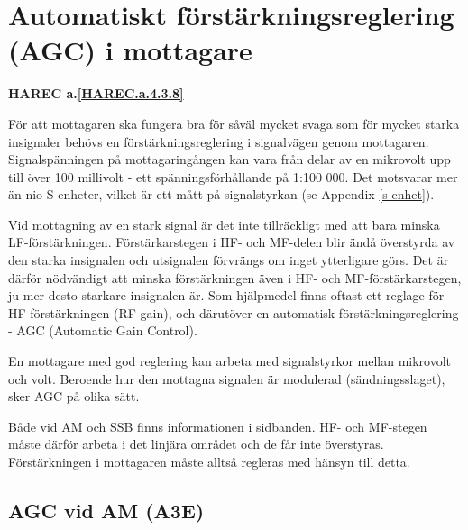 \section{Automatiskt förstärkningsreglering (AGC) i mottagare}
\textbf{HAREC a.\ref{HAREC.a.4.3.8}\label{myHAREC.a.4.3.8}}

För att mottagaren ska fungera bra för såväl mycket svaga som för
mycket starka insignaler behövs en förstärkningsreglering i
signalvägen genom mottagaren. Signalspänningen på mottagaringången kan
vara från delar av en mikrovolt upp till över 100 millivolt - ett
spänningsförhållande på 1:100 000. Det motsvarar mer än nio S-enheter,
vilket är ett mått på signalstyrkan (se Appendix \ref{s-enhet}).

Vid mottagning av en stark signal är det inte tillräckligt med att
bara minska LF-förstärkningen. Förstärkarstegen i HF- och MF-delen
blir ändå överstyrda av den starka insignalen och utsignalen förvrängs
om inget ytterligare görs. Det är därför nödvändigt att minska
förstärkningen även i HF- och MF-förstärkarstegen, ju mer desto
starkare insignalen är. Som hjälpmedel finns oftast ett reglage för
HF-förstärkningen (RF gain), och därutöver en automatisk
förstärkningsreglering - AGC (Automatic Gain Control).

En mottagare med god reglering kan arbeta med signalstyrkor mellan
mikrovolt och volt. Beroende hur den mottagna signalen är modulerad
(sändningsslaget), sker AGC på olika sätt.

Både vid AM och SSB finns informationen i sidbanden. HF- och MF-stegen
måste därför arbeta i det linjära området och de får inte
överstyras. Förstärkningen i mottagaren måste alltså regleras med
hänsyn till detta.

\subsection{AGC vid AM (A3E)}

